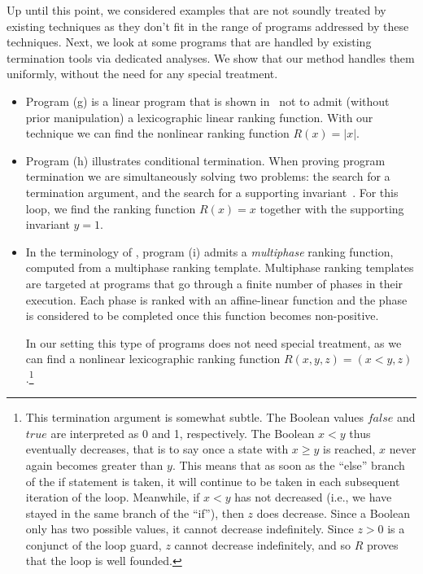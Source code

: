 \documentclass[a4paper]{llncs}
\begin{document}
Up until this point, we considered examples that are not soundly treated by
existing techniques as they don't fit in the range of programs addressed by
these techniques.  Next, we look at some programs that are handled by
existing termination tools via dedicated analyses.  We show that our method
handles them uniformly, without the need for any special treatment.
%
\begin{itemize}

\item Program (g) is a linear program that is shown
in~\cite{DBLP:conf/tacas/CookSZ13} not to admit (without prior manipulation)
a lexicographic linear ranking function.  With our technique we can find the
nonlinear ranking function $R(x) = |x|$.


\item Program (h) illustrates conditional termination.  When proving program
termination we are simultaneously solving two problems: the search for a
termination argument, and the search for a supporting
invariant~\cite{DBLP:conf/cav/BrockschmidtCF13}.  For this loop, we find the
ranking function $R(x) = x$ together with the supporting invariant $y=1$.

\item In the terminology of \cite{DBLP:conf/tacas/LeikeH14}, program (i)
admits a \emph{multiphase} ranking function, computed from a multiphase
ranking template.  Multiphase ranking templates are targeted at programs
that go through a finite number of phases in their execution.  Each phase is
ranked with an affine-linear function and the phase is considered to be
completed once this function becomes non-positive.

In our setting this type of programs does not need special treatment, as we
can find a nonlinear lexicographic ranking function $R(x, y, z) = (x < y,
z)$.\footnote{This termination argument is somewhat subtle.  The Boolean
values $\mathit{false}$ and $\mathit{true}$ are interpreted as 0 and 1,
respectively.  The Boolean $x < y$ thus eventually decreases, that is to say
once a state with $x \geq y$ is reached, $x$ never again becomes greater
than $y$.  This means that as soon as the ``else'' branch of the if
statement is taken, it will continue to be taken in each subsequent
iteration of the loop.  Meanwhile, if $x < y$ has not decreased (i.e., we
have stayed in the same branch of the ``if''), then $z$ does decrease. 
Since a Boolean only has two possible values, it cannot decrease
indefinitely.  Since $z > 0$ is a conjunct of the loop guard, $z$ cannot
decrease indefinitely, and so $R$ proves that the loop is well founded.}


\end{itemize}
\end{document}
